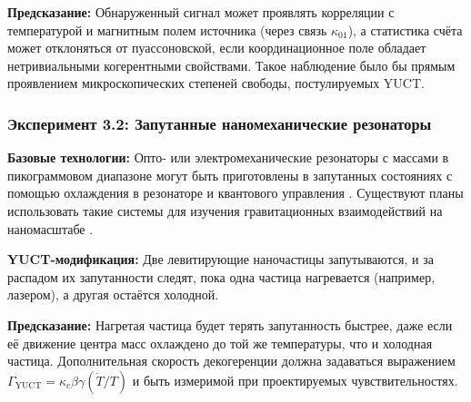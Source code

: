 \documentclass[12pt]{article}
\theoremstyle{remark}
\begin{document}
	\textbf{Предсказание:} Обнаруженный сигнал может проявлять корреляции с температурой и магнитным полем источника (через связь \(\kappa_{01}\)), а статистика счёта может отклоняться от пуассоновской, если координационное поле обладает нетривиальными когерентными свойствами. Такое наблюдение было бы прямым проявлением микроскопических степеней свободы, постулируемых YUCT.
	
	\subsubsection{Эксперимент 3.2: Запутанные наномеханические резонаторы}
	
	\textbf{Базовые технологии:} Опто- или электромеханические резонаторы с массами в пикограммовом диапазоне могут быть приготовлены в запутанных состояниях с помощью охлаждения в резонаторе и квантового управления \cite{Aspelmeyer2014}. Существуют планы использовать такие системы для изучения гравитационных взаимодействий на наномасштабе \cite{Geraci2010}.
	
	\textbf{YUCT-модификация:} Две левитирующие наночастицы запутываются, и за распадом их запутанности следят, пока одна частица нагревается (например, лазером), а другая остаётся холодной.
	
	\textbf{Предсказание:} Нагретая частица будет терять запутанность быстрее, даже если её движение центра масс охлаждено до той же температуры, что и холодная частица. Дополнительная скорость декогеренции должна задаваться выражением \(\Gamma_{\mathrm{YUCT}} = \kappa_c \beta\gamma (\dot{T}/T)\) и быть измеримой при проектируемых чувствительностях.
	
\end{document}
